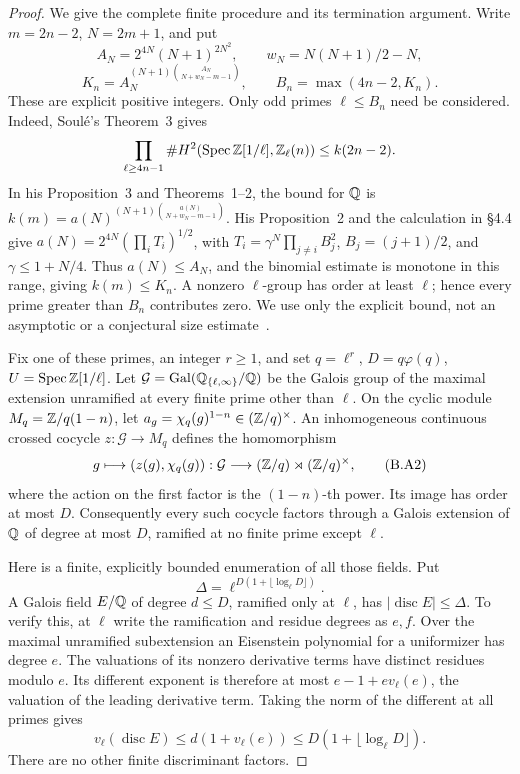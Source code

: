 \begin{proof}
We give the complete finite procedure and its termination argument.
Write \(m=2n-2\), \(N=2m+1\), and put
\[
 A_N=2^{4N}(N+1)^{2N^2},\qquad
 w_N=N(N+1)/2-N,
\]
\[
 K_n=A_N^{(N+1)\binom{A_N}{N+w_N-m-1}},\qquad
 B_n=\max(4n-2,K_n).
\tag{B.A1}
\]
These are explicit positive integers.  Only odd primes \(\ell\le B_n\)
need be considered.  Indeed, Soul\'e's Theorem~3 gives
\[
 \prod_{\ell\ge4n-1}
 \#H^2(\operatorname{Spec}\mathbb Z[1/\ell],\mathbb Z_\ell(n))\le k(2n-2).
\]
In his Proposition~3 and Theorems~1--2, the bound for \(\mathbb Q\) is
\(k(m)=a(N)^{(N+1)\binom{a(N)}{N+w_N-m-1}}\).
His Proposition~2 and the calculation in \S4.4 give
\(a(N)=2^{4N}(\prod_iT_i)^{1/2}\), with
\(T_i=\gamma^N\prod_{j\ne i}B_j^2\),
\(B_j=(j+1)/2\), and \(\gamma\le1+N/4\).
Thus \(a(N)\le A_N\), and the binomial estimate is monotone in this
range, giving \(k(m)\le K_n\).  A nonzero \(\ell\)-group has order
at least \(\ell\); hence every prime greater than \(B_n\) contributes
zero.  We use only the explicit bound, not an asymptotic or a
conjectural size estimate~\cite[Proposition~3, Theorems~1--3,
and \S4.4]{Soule2003Bound}.

Fix one of these primes, an integer \(r\ge1\), and set
\(q=\ell^r\), \(D=q\varphi(q)\), \(U=\operatorname{Spec}\mathbb Z[1/\ell]\).
Let \(\mathcal G=\operatorname{Gal}(\mathbb Q_{\{\ell,\infty\}}/\mathbb Q)\)
be the Galois group of the maximal extension unramified at every
finite prime other than \(\ell\).  On the cyclic module
\(M_q=\mathbb Z/q(1-n)\), let
\(a_g=\chi_q(g)^{1-n}\in(\mathbb Z/q)^\times\).
An inhomogeneous continuous crossed cocycle
\(z:\mathcal G\to M_q\) defines the homomorphism
\[
 g\longmapsto(z(g),\chi_q(g)):
 \mathcal G\longrightarrow
 (\mathbb Z/q)\rtimes(\mathbb Z/q)^\times,
\tag{B.A2}
\]
where the action on the first factor is the \((1-n)\)-th power.
Its image has order at most \(D\).  Consequently every such cocycle
factors through a Galois extension of \(\mathbb Q\) of degree at most
\(D\), ramified at no finite prime except \(\ell\).

Here is a finite, explicitly bounded enumeration of all those fields.
Put
\[
 \Delta=\ell^{D(1+\lfloor\log_\ell D\rfloor)}.
\tag{B.A3}
\]
A Galois field \(E/\mathbb Q\) of degree \(d\le D\), ramified only at
\(\ell\), has \(|\operatorname{disc}E|\le\Delta\).
To verify this, at \(\ell\) write the ramification and residue
degrees as \(e,f\).  Over the maximal unramified subextension an
Eisenstein polynomial for a uniformizer has degree \(e\).  The
valuations of its nonzero derivative terms have distinct residues
modulo \(e\).  Its different exponent is therefore at most
\(e-1+e v_\ell(e)\), the valuation of the leading derivative term.
Taking the norm of the different at all primes gives
\[
 v_\ell(\operatorname{disc}E)
 \le d(1+v_\ell(e))\le D(1+\lfloor\log_\ell D\rfloor).
\]
There are no other finite discriminant factors.


\end{proof}
